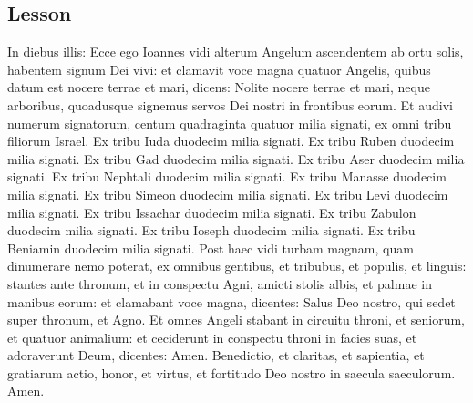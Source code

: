 \subsection{Lesson}
\label{proper-lesson}
\begin{latinproper}
In diebus illis: Ecce ego Ioannes vidi alterum Angelum ascendentem ab ortu solis, habentem signum Dei vivi: et clamavit voce magna quatuor Angelis, quibus datum est nocere terrae et mari, dicens: Nolite nocere terrae et mari, neque arboribus, quoadusque signemus servos Dei nostri in frontibus eorum. Et audivi numerum signatorum, centum quadraginta quatuor milia signati, ex omni tribu filiorum Israel. Ex tribu Iuda duodecim milia signati. Ex tribu Ruben duodecim milia signati. Ex tribu Gad duodecim milia signati. Ex tribu Aser duodecim milia signati. Ex tribu Nephtali duodecim milia signati. Ex tribu Manasse duodecim milia signati. Ex tribu Simeon duodecim milia signati. Ex tribu Levi duodecim milia signati. Ex tribu Issachar duodecim milia signati. Ex tribu Zabulon duodecim milia signati. Ex tribu Ioseph duodecim milia signati. Ex tribu Beniamin duodecim milia signati. Post haec vidi turbam magnam, quam dinumerare nemo poterat, ex omnibus gentibus, et tribubus, et populis, et linguis: stantes ante thronum, et in conspectu Agni, amicti stolis albis, et palmae in manibus eorum: et clamabant voce magna, dicentes: Salus Deo nostro, qui sedet super thronum, et Agno. Et omnes Angeli stabant in circuitu throni, et seniorum, et quatuor animalium: et ceciderunt in conspectu throni in facies suas, et adoraverunt Deum, dicentes: Amen. Benedictio, et claritas, et sapientia, et gratiarum actio, honor, et virtus, et fortitudo Deo nostro in saecula saeculorum. Amen.
\end{latinproper}
